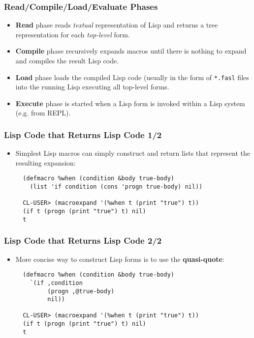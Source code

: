 \documentclass{beamer}
\begin{document}
\begin{frame}[fragile]
  \frametitle{Read/Compile/Load/Evaluate Phases}
  \begin{itemize}
  \item \textbf{Read} phase reads \textit{textual} representation of Lisp and
    returns a tree representation for each \textit{top-level} form.
  \item \textbf{Compile} phase recursively expands macros until there is nothing
    to expand and compiles the result Lisp code.
  \item \textbf{Load} phase loads the compiled Lisp code (usually in the form of
    \texttt{*.fasl} files into the running Lisp executing all
    top-level forms.
  \item \textbf{Execute} phase is started when a Lisp form is invoked within a
    Lisp system (e.g. from REPL).
  \end{itemize}
\end{frame}

\begin{frame}[fragile]
  \frametitle{Lisp Code that Returns Lisp Code 1/2}
  \begin{itemize}
  \item Simplest Lisp macros can simply construct and return lists that
    represent the resulting expansion:
\begin{verbatim}
  (defmacro %when (condition &body true-body)
    (list 'if condition (cons 'progn true-body) nil))

  CL-USER> (macroexpand '(%when t (print "true") t))
  (if t (progn (print "true") t) nil)
  t
\end{verbatim}
  \end{itemize}
\end{frame}

\begin{frame}[fragile]
  \frametitle{Lisp Code that Returns Lisp Code 2/2}
  \begin{itemize}
  \item More concise way to construct Lisp forms is to use the
    \textbf{quasi-quote}:
\begin{verbatim}
  (defmacro %when (condition &body true-body)
    `(if ,condition 
         (progn ,@true-body)
         nil))

  CL-USER> (macroexpand '(%when t (print "true") t))
  (if t (progn (print "true") t) nil)
  t
\end{verbatim}
  \end{itemize}
\end{frame}
\end{document}
